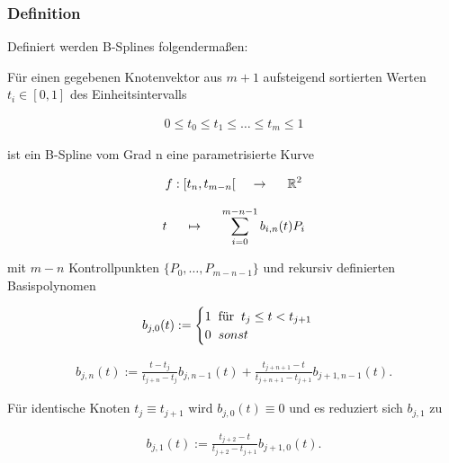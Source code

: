\subsubsection{Definition}
Definiert werden B-Splines folgendermaßen:

Für einen gegebenen Knotenvektor aus $m + 1$ aufsteigend sortierten Werten $t_{i} \in [0, 1]$ des Einheitsintervalls

\begin{align*}
0 \leq t_{0} \leq t_{1} \leq \dots \leq t_{m} \leq 1
\end{align*}

ist ein B-Spline vom Grad n eine parametrisierte Kurve

\begin{align*}
f: [t_{n}, t_{m-n}[ \hspace{5mm} \to \hspace{5mm} \mathbb{R}^{2}
\end{align*}

\begin{align*}
t \hspace{5mm} \mapsto \hspace{5mm} \sum_{i=0}^{m-n-1} b_{i,n}(t)P_{i}
\end{align*}

mit $m - n$ Kontrollpunkten $\{P_{0}, \dots , P_{m-n-1}\}$ und rekursiv definierten Basispolynomen

\begin{align*}
b_{j, 0}(t) := 
\begin{cases}
1 \hspace{2mm} $für$ \hspace{2mm} t_{j} \leq t < t_{j+1}\\
0 \hspace{2mm} sonst\\
\end{cases}
\end{align*}

\begin{align*}
b_{j, n}(t) := \frac{t - t_{j}}{t_{j + n} - t_{j}} b_{j, n-1} (t) + \frac{t_{j + n + 1} - t}{t_{j + n + 1} - t_{j + 1}} b_{j + 1, n - 1} (t).
\end{align*}

Für identische Knoten $t_{j} \equiv t_{j + 1}$ wird $b_{j, 0} (t) \equiv 0$ und es reduziert sich $b_{j, 1}$ zu

\begin{align*}
b_{j, 1}(t) := \frac{t_{j + 2} - t}{t_{j + 2} - t_{j + 1}} b_{j + 1, 0} (t).
\end{align*}

